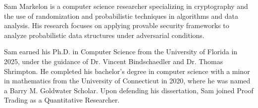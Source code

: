 


Sam Markelon is a computer science researcher specializing in cryptography and the use of randomization and probabilistic techniques in algorithms and data analysis. His research focuses on applying provable security frameworks to analyze probabilistic data structures under adversarial conditions.

Sam earned his Ph.D. in Computer Science from the University of Florida in 2025, under the guidance of Dr. Vincent Bindschaedler and Dr. Thomas Shrimpton. He completed his bachelor’s degree in computer science with a minor in mathematics from the University of Connecticut in 2020, where he was named a Barry M. Goldwater Scholar. Upon defending his dissertation, Sam joined Proof Trading as a Quantitative Researcher.